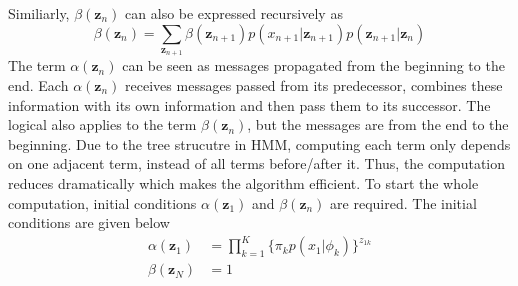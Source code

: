 Similiarly, \(\beta(\mathbf{z}_n)\) can also be expressed recursively as
\begin{equation}
	\beta(\mathbf{z}_n) = \sum_{\mathbf{z}_{n+1}}\beta(\mathbf{z}_{n+1})p(x_{n+1}|\mathbf{z}_{n+1})p(\mathbf{z}_{n+1}|\mathbf{z}_n)
\end{equation}
The term \(\alpha(\mathbf{z}_n)\) can be seen as messages propagated from the beginning to the end. Each \(\alpha(\mathbf{z}_n)\) receives messages passed from its predecessor, combines these information with its own information and then pass them to its successor. The logical also applies to the term \(\beta(\mathbf{z}_n)\), but the messages are from the end to the beginning. Due to the tree strucutre in HMM, computing each term only depends on one adjacent term, instead of all terms before/after it. Thus, the computation reduces dramatically which makes the algorithm efficient. To start the whole computation, initial conditions \(\alpha(\mathbf{z}_1)\) and \(\beta(\mathbf{z}_n)\) are required. The initial conditions are given below
\begin{align}
	\alpha(\mathbf{z}_1) &= \prod_{k=1}^{K}\{\pi_k p(x_1 | \phi_k) \}^{z_{1k}}	\\
	\beta(\mathbf{z}_N) &= 1
\end{align}

